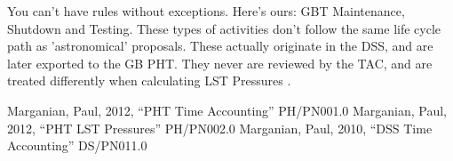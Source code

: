 \documentclass{article}
\begin{document}
You can't have rules without exceptions.  Here's ours:  GBT Maintenance,
Shutdown and Testing.  These types of activities don't follow the same life
cycle path as 'astronomical' proposals.  These actually originate in the DSS,
and are later exported to the GB PHT.  They never are reviewed by the TAC, and
are treated differently when calculating LST Pressures \cite{marganian12b}.


\begin{thebibliography}{}
  Marganian, Paul, 2012, ``PHT Time Accounting''
  PH/PN001.0
  Marganian, Paul, 2012, ``PHT LST Pressures''
  PH/PN002.0
  Marganian, Paul, 2010, ``DSS Time Accounting''
  DS/PN011.0
\end{thebibliography}{}
\end{document}
